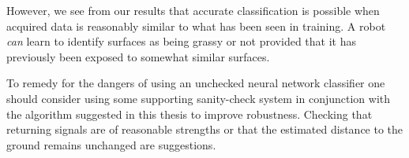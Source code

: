 However, we see from our results that accurate classification is possible when acquired data is reasonably similar to what has been seen in training. A robot \emph{can} learn to identify surfaces as being grassy or not provided that it has previously been exposed to somewhat similar surfaces. 

To remedy for the dangers of using an unchecked neural network classifier one should consider using some supporting sanity-check system in conjunction with the algorithm suggested in this thesis to improve robustness. Checking that returning signals are of reasonable strengths or that the estimated distance to the ground remains unchanged are suggestions.


